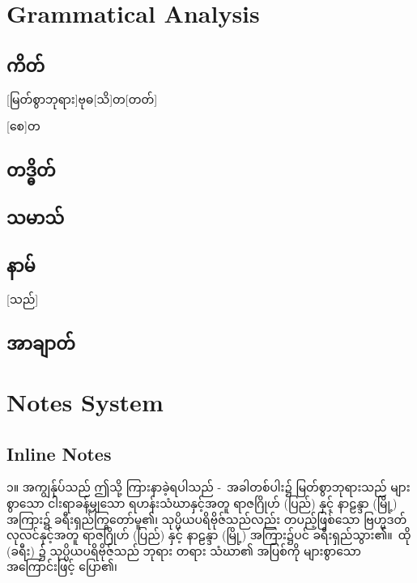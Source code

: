 


\section{Grammatical Analysis}
\subsection{ကိတ်}

[မြတ်စွာဘုရား]{ဗုဓ}[သိ]{တ}[တတ်]




[စေ]{တ}

\subsection{တဒ္ဓိတ်}

\subsection{သမာသ်}

\subsection{နာမ်}

[သည်]

\subsection{အာချာတ်}



\section{Notes System}
\subsection{Inline Notes}
၁။ အကျွန်ုပ်သည် ဤသို့ ကြားနာခဲ့ရပါသည် - အခါတစ်ပါး၌ မြတ်စွာဘုရားသည် များစွာသော ငါးရာခန့်မျှသော ရဟန်းသံဃာနှင့်အတူ ရာဇဂြိုဟ် (ပြည်) နှင့် နာဠန္ဒာ (မြို့) အကြား၌ ခရီးရှည်ကြွတော်မူ၏၊ သုပ္ပိယပရိဗိုဇ်သည်လည်း တပည့်ဖြစ်သော ဗြဟ္မဒတ်လုလင်နှင့်အတူ ရာဇဂြိုဟ် (ပြည်) နှင့် နာဠန္ဒာ (မြို့) အကြား၌ပင် ခရီးရှည်သွား၏။ ထို (ခရီး) ၌ သုပ္ပိယပရိဗိုဇ်သည် ဘုရား တရား သံဃာ၏ အပြစ်ကို များစွာသော အကြောင်းဖြင့် ပြော၏၊ 

